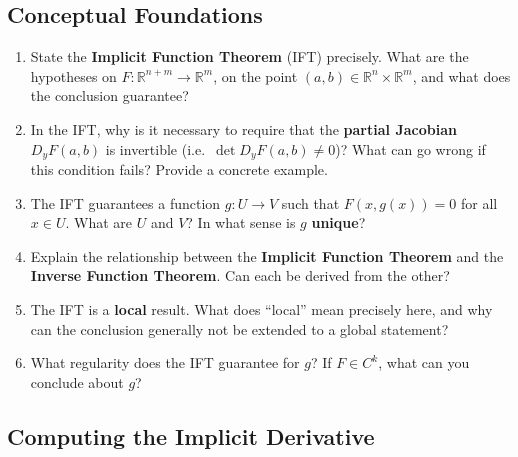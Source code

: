 \subsection{Conceptual Foundations}

\begin{enumerate}[leftmargin=*, label=\textbf{Q\arabic*.}]
  \item State the \textbf{Implicit Function Theorem} (IFT) precisely. What are the hypotheses on $F : \mathbb{R}^{n+m} \to \mathbb{R}^m$, on the point $(a, b) \in \mathbb{R}^n \times \mathbb{R}^m$, and what does the conclusion guarantee?
  \item In the IFT, why is it necessary to require that the \textbf{partial Jacobian} $D_y F(a,b)$ is invertible (i.e.\ $\det D_y F(a,b) \neq 0$)? What can go wrong if this condition fails? Provide a concrete example.
  \item The IFT guarantees a function $g : U \to V$ such that $F(x, g(x)) = 0$ for all $x \in U$. What are $U$ and $V$? In what sense is $g$ \textbf{unique}?
  \item Explain the relationship between the \textbf{Implicit Function Theorem} and the \textbf{Inverse Function Theorem}. Can each be derived from the other?
  \item The IFT is a \textbf{local} result. What does ``local'' mean precisely here, and why can the conclusion generally not be extended to a global statement?
  \item What regularity does the IFT guarantee for $g$? If $F \in C^k$, what can you conclude about $g$?
\end{enumerate}

\subsection{Computing the Implicit Derivative}

